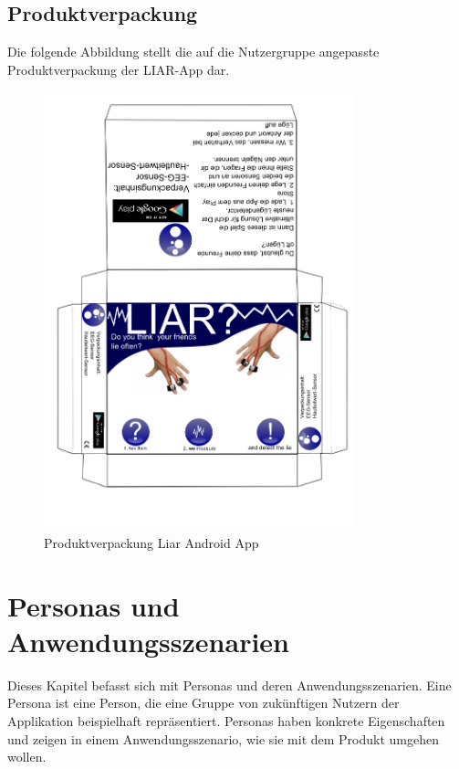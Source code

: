 \documentclass[10pt, a4paper, oneside, titlepage]{scrartcl} %
\begin{document}
   	\subsection{Produktverpackung}
   	Die folgende Abbildung stellt die auf die Nutzergruppe angepasste Produktverpackung der LIAR-App dar.
	\begin{figure}[ht!]
	\begin{center}
		\includegraphics[width=0.8\textwidth]{verpackung.png}
	\end{center}
	\caption[Produktverpackung]{Produktverpackung Liar Android App}
	\label{fig:verpackung}
	\end{figure}   
   
   	\newpage
   	\section{Personas und Anwendungsszenarien}
   	Dieses Kapitel befasst sich mit Personas und deren Anwendungsszenarien. Eine Persona ist eine Person, die eine Gruppe von zukünftigen Nutzern der Applikation beispielhaft repräsentiert. Personas haben konkrete Eigenschaften und zeigen in einem Anwendungsszenario, wie sie mit dem Produkt umgehen wollen.
   	
\end{document}
